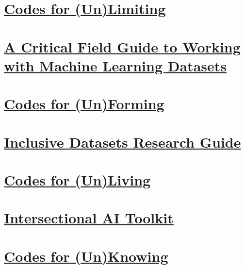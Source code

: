 \documentclass[11pt,oneside]{scrbook} %
\begin{document}
\chapter{\href{https://coding.care/unlimiting.html}{Codes for (Un)Limiting}}

\chapter{\href{https://knowingmachines.org/critical-field-guide}{A Critical Field Guide to Working with Machine Learning Datasets}}

\chapter{\href{https://coding.care/unforming.html}{Codes for (Un)Forming}}

\chapter{\href{https://libguides.usc.edu/inclusive-datasets}{Inclusive Datasets Research Guide}}

\chapter{\href{https://coding.care/unliving.html}{Codes for (Un)Living}}

\chapter{\href{https://intersectionalai.com}{Intersectional AI Toolkit}}

\chapter{\href{https://coding.care/unknowing.html}{Codes for (Un)Knowing}}
\end{document}
